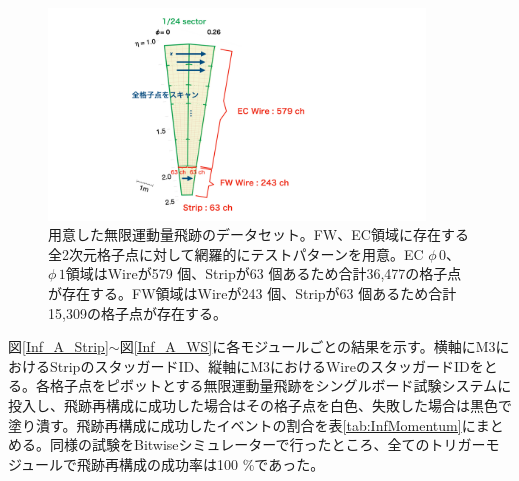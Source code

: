 \begin{figure} 
\centering
\includegraphics[width=10cm]{fig/Test/InfMomentum.pdf}
\caption[用意した無限運動量飛跡のデータセット]{用意した無限運動量飛跡のデータセット。FW、EC領域に存在する全2次元格子点に対して網羅的にテストパターンを用意。EC $\phi\,0$、$\phi\,1$領域はWireが579 個、Stripが63 個あるため合計36,477の格子点が存在する。FW領域はWireが243 個、Stripが63 個あるため合計15,309の格子点が存在する。}
\label{InfMomentum}
\end{figure}

図\ref{Inf_A_Strip}$\sim$図\ref{Inf_A_WS}に各モジュールごとの結果を示す。横軸にM3におけるStripのスタッガードID、縦軸にM3におけるWireのスタッガードIDをとる。各格子点をピボットとする無限運動量飛跡をシングルボード試験システムに投入し、飛跡再構成に成功した場合はその格子点を白色、失敗した場合は黒色で塗り潰す。飛跡再構成に成功したイベントの割合を表\ref{tab:InfMomentum}にまとめる。同様の試験をBitwiseシミュレーターで行ったところ、全てのトリガーモジュールで飛跡再構成の成功率は100 \%であった。

